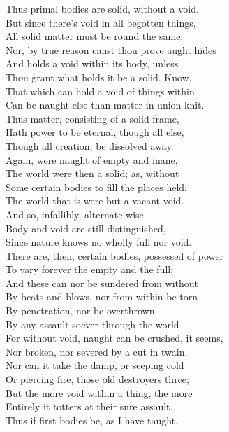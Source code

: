 Thus primal bodies are solid, without a void.\\
But since there's void in all begotten things,\\
All solid matter must be round the same;\\
Nor, by true reason canst thou prove aught hides\\
And holds a void within its body, unless\\
Thou grant what holds it be a solid. Know,\\
That which can hold a void of things within\\
Can be naught else than matter in union knit.\\
Thus matter, consisting of a solid frame,\\
Hath power to be eternal, though all else,\\
Though all creation, be dissolved away.\\
Again, were naught of empty and inane,\\
The world were then a solid; as, without\\
Some certain bodies to fill the places held,\\
The world that is were but a vacant void.\\
And so, infallibly, alternate-wise\\
Body and void are still distinguished,\\
Since nature knows no wholly full nor void.\\
There are, then, certain bodies, possessed of power\\
To vary forever the empty and the full;\\
And these can nor be sundered from without\\
By beats and blows, nor from within be torn\\
By penetration, nor be overthrown\\
By any assault soever through the world—\\
For without void, naught can be crushed, it seems,\\
Nor broken, nor severed by a cut in twain,\\
Nor can it take the damp, or seeping cold\\
Or piercing fire, those old destroyers three;\\
But the more void within a thing, the more\\
Entirely it totters at their sure assault.\\
Thus if first bodies be, as I have taught,\\
